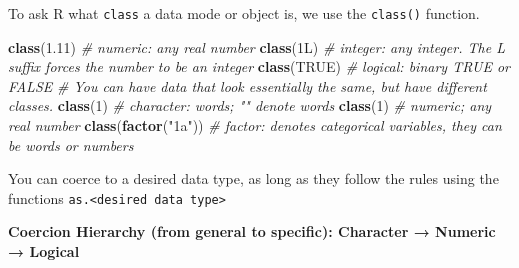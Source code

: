 \documentclass[
]{book}
\newenvironment{Shaded}{\begin{snugshade}}{\end{snugshade}}
\newcommand{\CommentTok}[1]{\textcolor[rgb]{0.56,0.35,0.01}{\textit{#1}}}
\newcommand{\ConstantTok}[1]{\textcolor[rgb]{0.56,0.35,0.01}{#1}}
\newcommand{\DataTypeTok}[1]{\textcolor[rgb]{0.13,0.29,0.53}{#1}}
\newcommand{\DecValTok}[1]{\textcolor[rgb]{0.00,0.00,0.81}{#1}}
\newcommand{\FloatTok}[1]{\textcolor[rgb]{0.00,0.00,0.81}{#1}}
\newcommand{\FunctionTok}[1]{\textcolor[rgb]{0.13,0.29,0.53}{\textbf{#1}}}
\newcommand{\NormalTok}[1]{#1}
\newcommand{\StringTok}[1]{\textcolor[rgb]{0.31,0.60,0.02}{#1}}
\begin{document}
To ask R what \texttt{class} a data mode or object is, we use the \texttt{class()} function.

\begin{Shaded}
\begin{Highlighting}[]
\FunctionTok{class}\NormalTok{(}\FloatTok{1.11}\NormalTok{) }\CommentTok{\# numeric: any real number}
\FunctionTok{class}\NormalTok{(}\DecValTok{1}\DataTypeTok{L}\NormalTok{) }\CommentTok{\# integer: any integer. The L suffix forces the number to be an integer}
\FunctionTok{class}\NormalTok{(}\ConstantTok{TRUE}\NormalTok{) }\CommentTok{\# logical: binary TRUE or FALSE }
\CommentTok{\# You can have data that look essentially the same, but have different classes. }
\FunctionTok{class}\NormalTok{(}\StringTok{\textquotesingle{}1\textquotesingle{}}\NormalTok{) }\CommentTok{\# character: words; "" denote words}
\FunctionTok{class}\NormalTok{(}\DecValTok{1}\NormalTok{) }\CommentTok{\# numeric; any real number}
\FunctionTok{class}\NormalTok{(}\FunctionTok{factor}\NormalTok{(}\StringTok{"1a"}\NormalTok{)) }\CommentTok{\# factor: denotes categorical variables, they can be words or numbers}
\end{Highlighting}
\end{Shaded}

You can coerce to a desired data type, as long as they follow the rules
using the functions \texttt{as.\textless{}desired\ data\ type\textgreater{}}

\textbf{Coercion Hierarchy (from general to specific): Character → Numeric → Logical}
\end{document}
